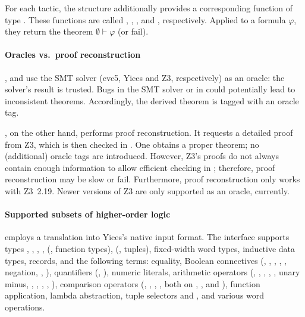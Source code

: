 For each tactic, the  structure additionally provides a
corresponding function of type .  These functions are
called , ,
, and , respectively.  Applied to
a formula $\varphi$, they return the theorem $\emptyset \vdash
\varphi$ (or fail).

\paragraph{Oracles vs.\ proof reconstruction}

,  and  use
the SMT solver (cvc5, Yices and Z3, respectively) as an oracle: the
solver's result is trusted.  Bugs in the SMT solver or in
 could potentially lead to inconsistent theorems.
Accordingly, the derived theorem is tagged with an oracle tag.

, on the other hand, performs proof reconstruction.  It
requests a detailed proof from Z3, which is then checked in \HOL{}.
One obtains a proper \HOL{} theorem; no (additional) oracle tags are
introduced. However, Z3's proofs do not always contain enough
information to allow efficient checking in \HOL{}; therefore, proof
reconstruction may be slow or fail. Furthermore, proof reconstruction
only works with Z3~2.19. Newer versions of Z3 are only supported as an
oracle, currently.

\paragraph{Supported subsets of higher-order logic}

 employs a translation into Yices's native input
format.  The interface supports types , ,
, , \holtxt{->} (\ie, function types),
 (\ie, tuples), fixed-width word types, inductive data
types, records, and the following terms: equality, Boolean connectives
(, , \holtxt{==>}, \holtxt{/\bs}, \holtxt{\bs /},
negation, , ), quantifiers
(\holtxt{!}, ), numeric literals, arithmetic operators
(, \holtxt{+}, \holtxt{-}, \holtxt{*}, \holtxt{/}, unary
minus, , , , ,
), comparison operators (\holtxt{<}, \holtxt{<=},
\holtxt{>}, \holtxt{>=}, both on , , and
), function application, lambda abstraction, tuple
selectors  and , and various word operations.

